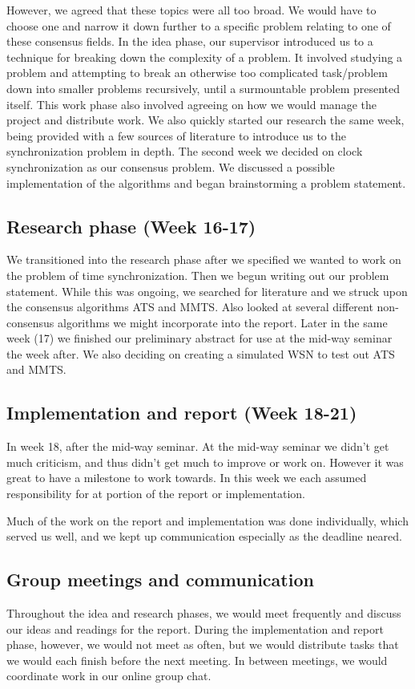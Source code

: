 \documentclass[a4paper,12pt]{article}
\begin{document}
However, we agreed that these topics were all too broad. We would have to choose one and narrow it down further to a specific problem relating to one of these consensus fields. In the idea phase, our supervisor introduced us to a technique for breaking down the complexity of a problem. It involved studying a problem and attempting to break an otherwise too complicated task/problem down into smaller problems recursively, until a surmountable problem presented itself. This work phase also involved agreeing on how we would manage the project and distribute work. We also quickly started our research the same week, being provided with a few sources of literature to introduce us to the synchronization problem in depth. The second week we decided on clock synchronization as our consensus problem. We discussed a possible implementation of the algorithms and began brainstorming a problem statement.

\subsection{Research phase (Week 16-17)}
We transitioned into the research phase after we specified we wanted to work on the problem of time synchronization. Then we begun writing out our problem statement. While this was ongoing, we searched  for literature and we struck upon the consensus algorithms ATS and MMTS. Also looked at several different non-consensus algorithms we might incorporate into the report. 
Later in the same week (17) we finished our preliminary abstract for use at the mid-way seminar the week after. We also deciding on creating a simulated WSN to test out ATS and MMTS.

\subsection{Implementation and report (Week 18-21)}

In week 18, after the mid-way seminar. At the mid-way seminar we didn't get much criticism, and thus didn't get much to improve or work on. However it was great to have a milestone to work towards. In this week we each assumed responsibility for at portion of the report or implementation.

Much of the work on the report and implementation was done individually, which served us well, and we kept up communication especially as the deadline neared.  

\subsection{Group meetings and communication}
Throughout the idea and research phases, we would meet frequently and discuss our ideas and readings for the report. During the implementation and report phase, however, we would not meet as often, but we would distribute tasks that we would each finish before the next meeting. In between meetings, we would coordinate work in our online group chat.
\end{document}
